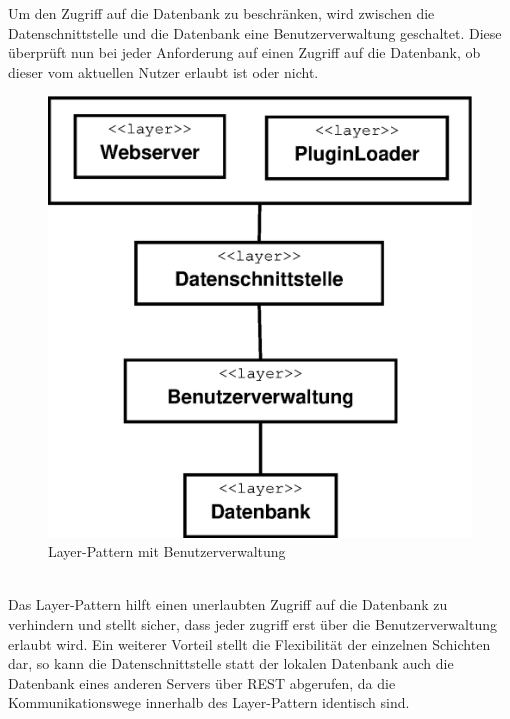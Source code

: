 Um den Zugriff auf die Datenbank zu beschränken, wird zwischen die Datenschnittstelle und die Datenbank eine Benutzerverwaltung geschaltet. Diese überprüft nun bei jeder Anforderung auf einen Zugriff auf die Datenbank, ob dieser vom aktuellen Nutzer erlaubt ist oder nicht.
\begin{figure}
	\vspace{-15pt}
\begin{center}
\includegraphics[width=1\linewidth]{Grafik/Diagramm/Layer}
\end{center}
\vspace{-15pt}
\caption[Layer-Klassen]{Layer-Pattern mit Benutzerverwaltung}
\label{fig:Layer}
\vspace{-70pt}
\end{figure}\\
Das Layer-Pattern hilft einen unerlaubten Zugriff auf die Datenbank zu verhindern und stellt sicher, dass jeder zugriff erst über die Benutzerverwaltung erlaubt wird. Ein weiterer Vorteil stellt die Flexibilität der einzelnen Schichten dar, so kann die Datenschnittstelle statt der lokalen Datenbank auch die Datenbank eines anderen Servers über REST abgerufen, da die Kommunikationswege innerhalb des Layer-Pattern identisch sind.
\vspace{30pt}